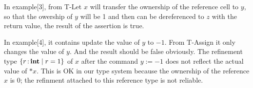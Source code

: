 \documentclass[runningheads]{llncs}
\begin{document}
In example[3], from T-Let $x$ will transfer the ownership of the reference cell to $y$, so that the
owership of $y$ will be 1 and then can be dereferenced to $z$ with the return value, the result of
the assertion is true.

\begin{parcolumns}{2}
\colplacechunks
\end{parcolumns}

In example[4], it contains update the value of $y$ to $-1$. From T-Assign it only changes the value of $y$.
And the result should be false obviously.
The refinement type $\left\{{r \operatorname{:} \mathbf{int} \mid r = 1}\right\}$ of $x$ after the command $y := -1$ does not reflect the actual value of $*x$.  This is OK in our type system because the ownership of the reference $x$ is $0$; the refinment attached to this reference type is not reliable.

\begin{parcolumns}{2}
\colplacechunks
\end{parcolumns}
\end{document}
